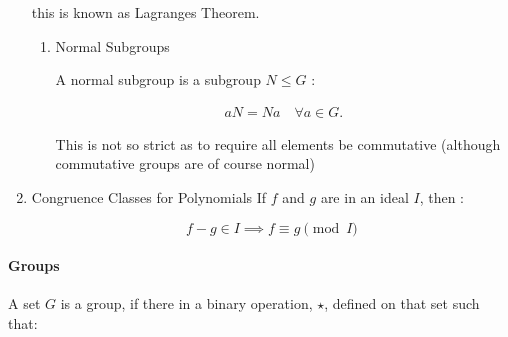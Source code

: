 \documentclass[a4paper,11pt,twoside]{article}
\begin{document}
\begin{enumerate}
this is known as Lagranges Theorem. \cite[\S 3.7]{gregoryleeAbstractAlgebra2018}


\begin{enumerate}
\item Normal Subgroups
\label{sec:orgb07e518}

A normal subgroup is a subgroup \(N \leq G\) :

\begin{align*}
      aN= Na \quad \forall a \in G
.\end{align*}

This is not so strict as to require all elements be commutative (although
commutative groups are of course normal)
\end{enumerate}

\item Congruence Classes for Polynomials
\label{sec:org9aef1f9}
If \(f\) and \(g\) are in an ideal \(I\), then \cite[p. 240]{coxIdealsVarietiesAlgorithms1997}:

\[
       f-g \in I \implies f \equiv g \pmod{I}
       \]
\end{enumerate}
\paragraph{Groups}
\label{sec:orga3cc50e}
A set \(G\) is a group, if there in a binary operation, \(\star\),
defined on that set such that:
\end{document}

